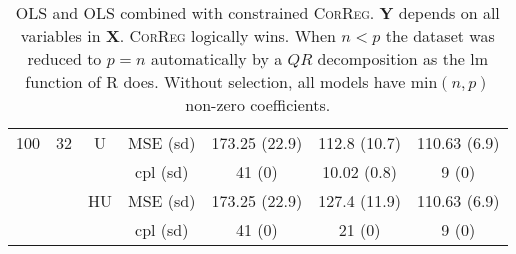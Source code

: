 \documentclass[11pt,a4paper]{article}
\begin{document}
\begin{table}[h!]
\begin{tabular}{|c|c|c|c|c|c|c|}
\hline %
100 & 32 & U&  MSE (sd) & 173.25 (22.9) & 112.8 (10.7) & 110.63 (6.9) \\
& & & cpl (sd) & 41 (0) & 10.02 (0.8) & 9 (0) \\
 &  &HU & MSE (sd) & 173.25 (22.9) & 127.4 (11.9) & 110.63 (6.9) \\
& & & cpl (sd) & 41 (0) & 21 (0) & 9 (0) \\
\hline
\end{tabular} 
\caption{OLS and OLS combined with constrained \textsc{CorReg}. $\boldsymbol{Y}$  depends on all variables in $\boldsymbol{X}$. \textsc{CorReg} logically wins. When $n<p$ the dataset was reduced to $p=n$ automatically by a $QR$ decomposition as the lm function of R does. Without selection, all models have min$(n,p)$ non-zero coefficients.} \label{YXlinOLS}
\end{table}
\end{document}
